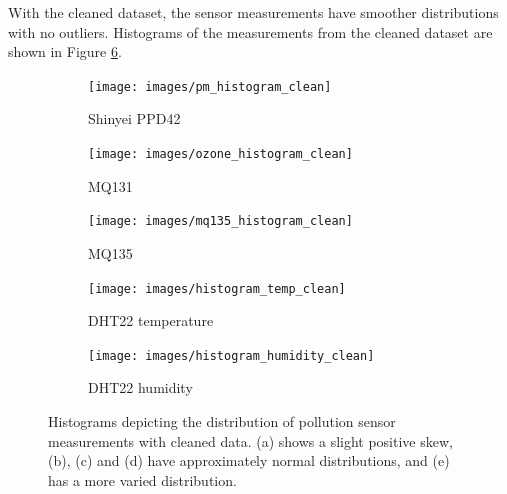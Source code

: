 \documentclass[11pt,twosided,a4paper]{report}
\begin{document}
With the cleaned dataset, the sensor measurements have smoother distributions with no outliers. Histograms of the measurements from the cleaned dataset are shown in Figure \ref{fig:histograms_clean}.

\begin{figure}[!tbp]
    \centering
    \begin{minipage}{1\linewidth}
            \begin{subfigure}[t]{.5\linewidth}
                \texttt{[image: images/pm\_histogram\_clean]}
                \caption{Shinyei PPD42}
                \label{fig:pm_histogram_clean}
            \end{subfigure}
            \begin{subfigure}[t]{.5\linewidth}
            	\texttt{[image: images/ozone\_histogram\_clean]}
            	\caption{MQ131}
            	\label{fig:ozone_histogram_clean}
	   \end{subfigure}
        \end{minipage}
    \begin{minipage}{1\linewidth}
            \begin{subfigure}[t]{.5\linewidth}
                \texttt{[image: images/mq135\_histogram\_clean]}
                \caption{MQ135}
                \label{fig:mq135_histogram_clean}
            \end{subfigure}
            \begin{subfigure}[t]{.5\linewidth}
            	\texttt{[image: images/histogram\_temp\_clean]}
            	\caption{DHT22 temperature}
            	\label{fig:temp_histogram_clean}
	   \end{subfigure}
        \end{minipage}
    \begin{minipage}{1\linewidth}
    	\centering
        \begin{subfigure}[t]{.5\linewidth}
            \texttt{[image: images/histogram\_humidity\_clean]}
            \caption{DHT22 humidity}
            \label{fig:humidity_histogram_clean}
        \end{subfigure}
    \end{minipage}
    \caption[Sensor measurement histograms with cleaned data.]{Histograms depicting the distribution of pollution sensor measurements with cleaned data. (a) shows a slight positive skew, (b), (c) and (d) have approximately normal distributions, and (e) has a more varied distribution.}
    \label{fig:histograms_clean}
\end{figure}
\end{document}
